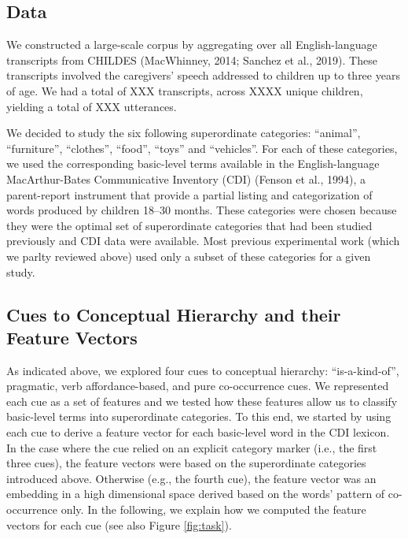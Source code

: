 \documentclass[10pt, letterpaper]{article}
\begin{document}
\hypertarget{data}{%
\subsection{Data}\label{data}}

We constructed a large-scale corpus by aggregating over all
English-language transcripts from CHILDES (MacWhinney, 2014; Sanchez et
al., 2019). These transcripts involved the caregivers' speech addressed
to children up to three years of age. We had a total of XXX transcripts,
across XXXX unique children, yielding a total of XXX utterances.

We decided to study the six following superordinate categories:
``animal'', ``furniture'', ``clothes'', ``food'', ``toys'' and
``vehicles''. For each of these categories, we used the corresponding
basic-level terms available in the English-language MacArthur-Bates
Communicative Inventory (CDI) (Fenson et al., 1994), a parent-report
instrument that provide a partial listing and categorization of words
produced by children 18--30 months. These categories were chosen because
they were the optimal set of superordinate categories that had been
studied previously and CDI data were available. Most previous
experimental work (which we parlty reviewed above) used only a subset of
these categories for a given study.

\hypertarget{cues-to-conceptual-hierarchy-and-their-feature-vectors}{%
\subsection{Cues to Conceptual Hierarchy and their Feature
Vectors}\label{cues-to-conceptual-hierarchy-and-their-feature-vectors}}

As indicated above, we explored four cues to conceptual hierarchy:
``is-a-kind-of'', pragmatic, verb affordance-based, and pure
co-occurrence cues. We represented each cue as a set of features and we
tested how these features allow us to classify basic-level terms into
superordinate categories. To this end, we started by using each cue to
derive a feature vector for each basic-level word in the CDI lexicon. In
the case where the cue relied on an explicit category marker (i.e., the
first three cues), the feature vectors were based on the superordinate
categories introduced above. Otherwise (e.g., the fourth cue), the
feature vector was an embedding in a high dimensional space derived
based on the words' pattern of co-occurrence only. In the following, we
explain how we computed the feature vectors for each cue (see also
Figure \ref{fig:task}).
\end{document}
